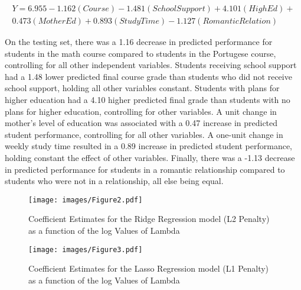 \documentclass[sigconf]{acmart}
\begin{document}
\begin{equation*}
 \begin{aligned}
  Y = 6.955 - 1.162(Course) - 1.481(SchoolSupport) + 4.101(HighEd) + \\
  0.473(MotherEd) + 0.893(StudyTime) - 1.127(RomanticRelation)
 \end{aligned}
\end{equation*}


On the testing set, there was a 1.16 decrease in predicted performance 
for students in the math course compared to students in the Portugese course, 
controlling for all other independent variables. Students receiving school 
support had a 1.48 lower predicted final course grade than students who did not 
receive school support, holding all other variables constant. Students with plans 
for higher education had a 4.10 higher predicted final grade than students with 
no plans for higher education, controlling for other variables. A unit change 
in mother's level of education was associated with a 0.47 increase in predicted 
student performance, controlling for all other variables. A one-unit change in 
weekly study time resulted in a 0.89 increase in predicted student performance, 
holding constant the effect of other variables. Finally, there was a -1.13 
decrease in predicted performance for students in a romantic relationship 
compared to students who were not in a relationship, all else being equal. 


\begin{figure}[!ht]
  \centering\texttt{[image: images/Figure2.pdf]}
  \caption{Coefficient Estimates for the Ridge Regression model 
  (L2 Penalty) as a function of the log Values of Lambda}
  \label{f:Figure2}
\end{figure}

\begin{figure}[!ht]
  \centering\texttt{[image: images/Figure3.pdf]}
  \caption{Coefficient Estimates for the Lasso Regression model 
  (L1 Penalty) as a function of the log Values of Lambda}
  \label{f:Figure3}
\end{figure}

\end{document}
